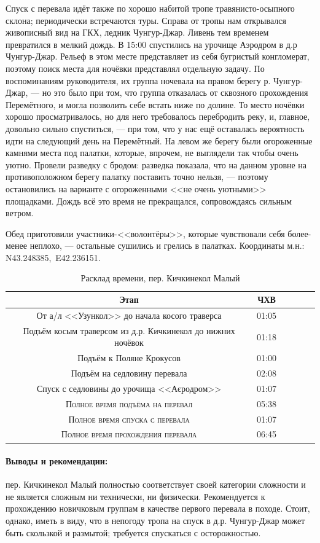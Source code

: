 Спуск с перевала идёт также по хорошо набитой тропе травянисто-осыпного склона; периодически встречаются туры. Справа от тропы нам открывался живописный вид на ГКХ, ледник Чунгур-Джар. Ливень тем временем превратился в мелкий дождь. В 15:00 спустились на урочище Аэродром в д.р Чунгур-Джар. Рельеф в этом месте представляет из себя бугристый конгломерат, поэтому поиск места для ночёвки представлял отдельную задачу. По воспоминаниям руководителя, их группа \cite{Korolyov2018} ночевала на правом берегу р. Чунгур-Джар, --- но это было при том, что группа отказалась от сквозного прохождения Перемётного, и могла позволить себе встать ниже по долине. То место ночёвки хорошо просматривалось, но для него требовалось перебродить реку, и, главное, довольно сильно спуститься, --- при том, что у нас ещё оставалась вероятность идти на следующий день на Перемётный. На левом же берегу были огороженные камнями места под палатки, которые, впрочем, не выглядели так чтобы очень уютно. Провели разведку с бродом: разведка показала, что на данном уровне на противоположном берегу палатку поставить точно нельзя, --- поэтому остановились на варианте с огороженными <<не очень уютными>> площадками. Дождь всё это время не прекращался, сопровождаясь сильным ветром.

Обед приготовили участники-<<волонтёры>>, которые чувствовали себя более-менее неплохо, --- остальные сушились и грелись в палатках. Координаты м.н.: N43.248385\degree,~E42.236151\degree.

\begin{table}[h!]
	\centering
	\begin{tabular}{|c|c|c|c|c|c|} 
		\hline 
		Этап & ЧХВ \\ 	
		\hline 
		От а/л <<Узункол>> до начала косого траверса  & 01:05 \\
		Подъём косым траверсом из д.р. Кичкинекол до нижних ночёвок  & 01:18 \\
		Подъём к Поляне Крокусов & 01:00\\ 
		Подъём на седловину перевала & 02:08\\ 
		Спуск с седловины до урочища <<Аєродром>> & 01:07 \\
		
		\hline
		\textsc{Полное время подъёма на перевал  }& 05:38\\
		\textsc{Полное время спуска с перевала }& 01:07 \\
		\textsc{Полное время прохождения перевала }& 06:45 \\
		\hline
	\end{tabular}
	\caption{Расклад времени, пер. Кичкинекол Малый}
\end{table}

\paragraph{Выводы и рекомендации:} пер. Кичкинекол Малый полностью соответствует своей категории сложности и не является сложным ни технически, ни физически. Рекомендуется к прохождению новичковым группам в качестве первого перевала в походе. Стоит, однако, иметь в виду, что в непогоду тропа на спуск в д.р. Чунгур-Джар может быть скользкой и размытой; требуется спускаться с осторожностью.

\clearpage